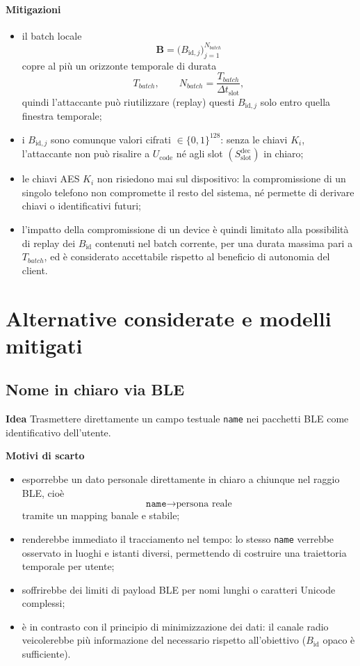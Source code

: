 \documentclass[a4paper,11pt]{article}
\begin{document}
\paragraph{Mitigazioni}
\begin{itemize}
  \item il batch locale
        \[
          \mathbf{B}
          = \bigl(B_{\text{id},j}\bigr)_{j=1}^{N_{batch}}
        \]
        copre al più un orizzonte temporale di durata
        \[
          T_{batch},
          \qquad
          N_{batch} = \frac{T_{batch}}{\Delta t_{\text{slot}}},
        \]
        quindi l’attaccante può riutilizzare (replay) questi \(B_{\text{id},j}\) solo entro
        quella finestra temporale;
  \item i \(B_{\text{id},j}\) sono comunque valori cifrati
        \(\in \{0,1\}^{128}\): senza le chiavi \(K_i\), l’attaccante non può risalire a
        \(U_{\text{code}}\) né agli slot \((S_{\text{slot}}^{\text{dec}})\) in chiaro;
  \item le chiavi AES \(K_i\) non risiedono mai sul dispositivo: la compromissione di un singolo
        telefono non compromette il resto del sistema, né permette di derivare chiavi o
        identificativi futuri;
  \item l’impatto della compromissione di un device è quindi limitato alla possibilità di replay
        dei \(B_{\text{id}}\) contenuti nel batch corrente, per una durata massima pari a
        \(T_{batch}\), ed è considerato accettabile rispetto al beneficio di autonomia del client.
\end{itemize}

\section{Alternative considerate e modelli mitigati}
\subsection{Nome in chiaro via BLE}

\textbf{Idea}
Trasmettere direttamente un campo testuale \texttt{name} nei pacchetti
BLE come identificativo dell'utente.

\textbf{Motivi di scarto}

\begin{itemize}[nosep]
  \item esporrebbe un dato personale direttamente in chiaro a chiunque nel raggio BLE, cioè
        \[
          \texttt{name} \longrightarrow \text{persona reale}
        \]
        tramite un mapping banale e stabile;
  \item renderebbe immediato il tracciamento nel tempo: lo stesso \texttt{name} verrebbe osservato
        in luoghi e istanti diversi, permettendo di costruire una traiettoria temporale per utente;
  \item soffrirebbe dei limiti di payload BLE per nomi lunghi o caratteri Unicode complessi;
  \item è in contrasto con il principio di minimizzazione dei dati: il canale radio veicolerebbe
        più informazione del necessario rispetto all’obiettivo (\(B_{\text{id}}\) opaco è sufficiente).
\end{itemize}
\end{document}
